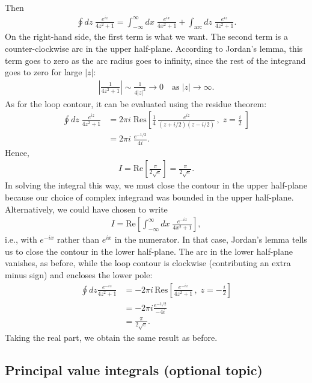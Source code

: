\documentclass[10pt,a4paper]{article}
\begin{document}
\noindent
Then
\begin{align}
  \oint dz \; \frac{e^{iz}}{4z^2 + 1} = \int_{-\infty}^\infty dx\; \frac{e^{ix}}{4x^2 + 1} + \int_{\mathrm{arc}} dz \; \frac{e^{iz}}{4z^2 + 1}.
\end{align}
On the right-hand side, the first term is what we want. The second
term is a counter-clockwise arc in the upper half-plane. According to
Jordan's lemma, this term goes to zero as the arc radius goes to
infinity, since the rest of the integrand goes to zero for large
$|z|$:
\begin{align}
  \left|\frac{1}{4z^2 + 1}\right| \sim \frac{1}{4|z|^2} \rightarrow 0 \quad \mathrm{as} \;|z| \rightarrow \infty.
\end{align}
As for the loop contour, it can be evaluated using the residue
theorem:
\begin{align}
  \oint dz \; \frac{e^{iz}}{4z^2 + 1} &= 2\pi i \; \mathrm{Res}\left[\frac{1}{4}\, \frac{e^{iz}}{(z+i/2)(z-i/2)}\,,\; z = \frac{i}{2} \;\right] \\
  &= 2\pi i \; \frac{e^{-1/2}}{4i}.
\end{align}
Hence,
\begin{align}
  I = \mathrm{Re}\left[\frac{\pi}{2\sqrt{e}}\right]= \frac{\pi}{2\sqrt{e}}.
\end{align}
In solving the integral this way, we must close the contour in the
upper half-plane because our choice of complex integrand was bounded
in the upper half-plane.  Alternatively, we could have chosen to write
\begin{align}
  I = \mathrm{Re} \left[ \int_{-\infty}^\infty dx\; \frac{e^{-ix}}{4x^2 + 1}\right],
\end{align}
i.e., with $e^{-ix}$ rather than $e^{ix}$ in the numerator.  In that
case, Jordan's lemma tells us to close the contour in the lower
half-plane.  The arc in the lower half-plane vanishes, as before,
while the loop contour is clockwise (contributing an extra minus sign)
and encloses the lower pole:
\begin{align}
  \oint dz \frac{e^{-iz}}{4z^2 + 1} &= -2\pi i \, \mathrm{Res}\left[ \frac{e^{-iz}}{4z^2 + 1}\,, \; z = -\frac{i}{2} \right] \\
  &= - 2\pi i \frac{e^{-1/2}}{-4i} \\
  &= \frac{\pi}{2\sqrt{e}}.
\end{align}
Taking the real part, we obtain the same result as before.

\subsection{Principal value integrals (optional topic)}
\label{principal-value-integrals}
\end{document}
